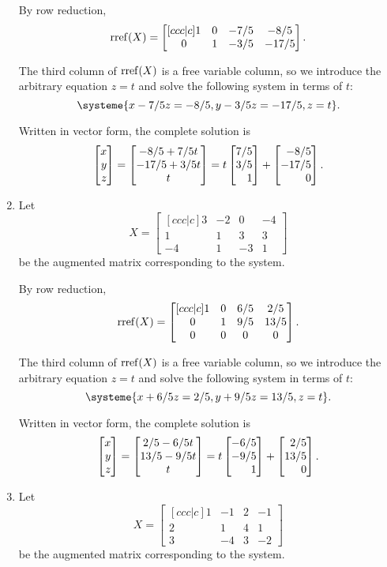 \begin{exercises}
\begin{problist}
\begin{solution}
\begin{enumerate}
				By row reduction,
				\[
					\operatorname{rref}(X)=
					\begin{bmatrix}[ccc|c]
						1 & 0 & -7/5 & -8/5\\
						0 & 1 & -3/5 & -17/5
					\end{bmatrix}.
				\]
				
				The third column of $\operatorname{rref}(X)$ is a free variable column, so
				we introduce the arbitrary equation $z=t$ and solve the following system
				in terms of $t$:
				\[
					\systeme{x-7/5z=-8/5,y-3/5z=-17/5,z=t}.
				\]
				
				Written in vector form, the complete solution is
				\[
					\mat{x\\y\\z} = \matc{-8/5+7/5t\\-17/5+3/5t\\t} = t\mat{7/5\\3/5\\1}+\mat{-8/5\\-17/5\\0}.
				\]
				\item 
				Let
				\[
					X=
					\begin{bmatrix}[ccc|c]
						3 & -2 & 0 & -4\\
						1 & 1 & 3 & 3\\
						-4 & 1 & -3 & 1
					\end{bmatrix}
				\]
				be the augmented matrix corresponding to the system.
				
				By row reduction,
				\[
					\operatorname{rref}(X)=
					\begin{bmatrix}[ccc|c]
						1 & 0 & 6/5 & 2/5\\
						0 & 1 & 9/5 & 13/5\\
						0 & 0 & 0 & 0
					\end{bmatrix}.
				\]
				
				The third column of $\operatorname{rref}(X)$ is a free variable column, so
				we introduce the arbitrary equation $z=t$ and solve the following system
				in terms of $t$:
				\[
					\systeme{x+6/5z=2/5,y+9/5z=13/5,z=t}.
				\]
				
				Written in vector form, the complete solution is
				\[
					\mat{x\\y\\z} = \matc{2/5-6/5t\\13/5-9/5t\\t} = t\mat{-6/5\\-9/5\\1}+\mat{2/5\\13/5\\0}.
				\]
				\item 
				Let
				\[
					X=
					\begin{bmatrix}[ccc|c]
						1 & -1 & 2 & -1\\
						2 & 1 & 4 & 1\\
						3 & -4 & 3 & -2
					\end{bmatrix}
				\]
				be the augmented matrix corresponding to the system.
				

\end{enumerate}
\end{solution}
\end{problist}
\end{exercises}
